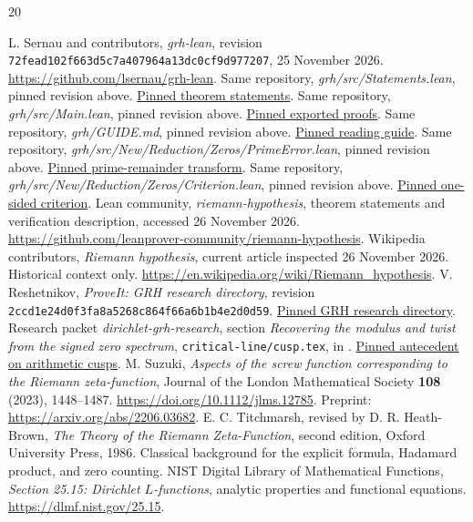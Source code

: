 \documentclass[11pt]{article}
\theoremstyle{definition}
\begin{document}
\begin{thebibliography}{20}
\raggedright
{} L. Sernau and contributors, \emph{grh-lean}, revision
\texttt{72fead102f663d5c7a407964a13dc0cf9d977207}, 25 November 2026.
\url{https://github.com/lsernau/grh-lean}.
 Same repository, \emph{grh/src/Statements.lean}, pinned revision above.
\href{https://github.com/lsernau/grh-lean/blob/72fead102f663d5c7a407964a13dc0cf9d977207/grh/src/Statements.lean}{Pinned theorem statements}.
 Same repository, \emph{grh/src/Main.lean}, pinned revision above.
\href{https://github.com/lsernau/grh-lean/blob/72fead102f663d5c7a407964a13dc0cf9d977207/grh/src/Main.lean}{Pinned exported proofs}.
 Same repository, \emph{grh/GUIDE.md}, pinned revision above.
\href{https://github.com/lsernau/grh-lean/blob/72fead102f663d5c7a407964a13dc0cf9d977207/grh/GUIDE.md}{Pinned reading guide}.
 Same repository, \emph{grh/src/New/Reduction/Zeros/PrimeError.lean},
pinned revision above. \href{https://github.com/lsernau/grh-lean/blob/72fead102f663d5c7a407964a13dc0cf9d977207/grh/src/New/Reduction/Zeros/PrimeError.lean}{Pinned prime-remainder transform}.
 Same repository, \emph{grh/src/New/Reduction/Zeros/Criterion.lean},
pinned revision above. \href{https://github.com/lsernau/grh-lean/blob/72fead102f663d5c7a407964a13dc0cf9d977207/grh/src/New/Reduction/Zeros/Criterion.lean}{Pinned one-sided criterion}.
 Lean community, \emph{riemann-hypothesis}, theorem statements and
verification description, accessed 26 November 2026.
\url{https://github.com/leanprover-community/riemann-hypothesis}.
 Wikipedia contributors, \emph{Riemann hypothesis}, current article
inspected 26 November 2026. Historical context only.
\url{https://en.wikipedia.org/wiki/Riemann_hypothesis}.
 V. Reshetnikov, \emph{ProveIt: GRH research directory},
revision \texttt{2ccd1e24d0f3fa8a5268c864f66a6b1b4e2d0d59}.
\href{https://github.com/VladimirReshetnikov/ProveIt/tree/2ccd1e24d0f3fa8a5268c864f66a6b1b4e2d0d59/Analysis/GeneralizedRiemannHypothesis}{Pinned GRH research directory}.
 Research packet \emph{dirichlet-grh-research}, section
\emph{Recovering the modulus and twist from the signed zero spectrum},
\texttt{critical-line/cusp.tex}, in \cite{proveit}.
\href{https://github.com/VladimirReshetnikov/ProveIt/blob/2ccd1e24d0f3fa8a5268c864f66a6b1b4e2d0d59/Analysis/GeneralizedRiemannHypothesis/Research/dirichlet-grh-research/critical-line/cusp.tex}{Pinned antecedent on arithmetic cusps}.
 M. Suzuki, \emph{Aspects of the screw function corresponding to the
Riemann zeta-function}, Journal of the London Mathematical Society \textbf{108}
(2023), 1448--1487. \url{https://doi.org/10.1112/jlms.12785}.
Preprint: \url{https://arxiv.org/abs/2206.03682}.
 E. C. Titchmarsh, revised by D. R. Heath-Brown,
\emph{The Theory of the Riemann Zeta-Function}, second edition,
Oxford University Press, 1986. Classical background for the explicit formula,
Hadamard product, and zero counting.
 NIST Digital Library of Mathematical Functions,
\emph{Section 25.15: Dirichlet $L$-functions}, analytic properties and
functional equations. \url{https://dlmf.nist.gov/25.15}.
\end{thebibliography}
\end{document}
